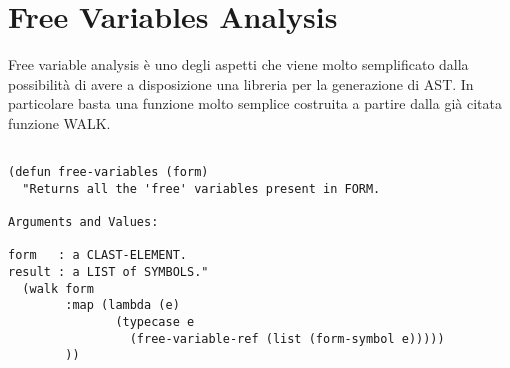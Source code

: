 \section{Free Variables Analysis}
\label{free-variables-analysis}

Free variable analysis è uno degli aspetti che viene molto semplificato dalla
possibilità di avere a disposizione una libreria per la generazione di AST. In
particolare basta una funzione molto semplice costruita a partire dalla già
citata funzione WALK.



\begin{lstlisting}[caption=Query functions per l'identificazione di variabili
libere all'interno di una form Common Lisp]

(defun free-variables (form)
  "Returns all the 'free' variables present in FORM.

Arguments and Values:

form   : a CLAST-ELEMENT.
result : a LIST of SYMBOLS."
  (walk form
        :map (lambda (e)
               (typecase e
                 (free-variable-ref (list (form-symbol e)))))
        ))

\end{lstlisting}
